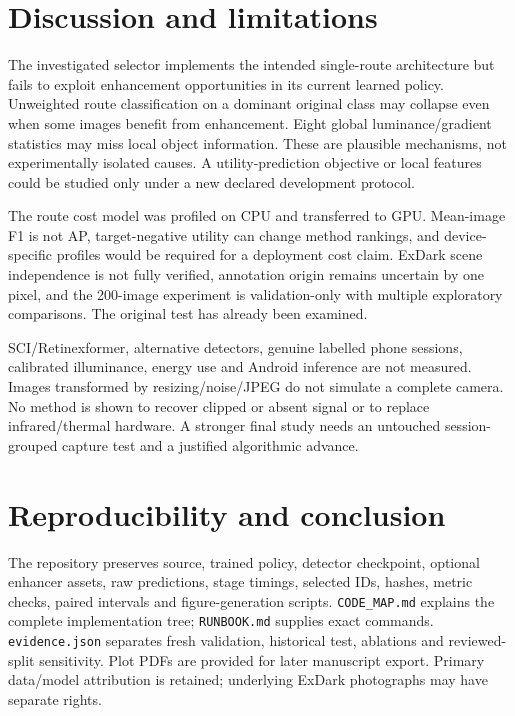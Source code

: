 \documentclass[11pt,a4paper]{article}
\begin{document}
\section{Discussion and limitations}

The investigated selector implements the intended single-route architecture but fails to exploit enhancement opportunities in its current learned policy. Unweighted route classification on a dominant original class may collapse even when some images benefit from enhancement. Eight global luminance/gradient statistics may miss local object information. These are plausible mechanisms, not experimentally isolated causes. A utility-prediction objective or local features could be studied only under a new declared development protocol.


The route cost model was profiled on CPU and transferred to GPU. Mean-image F1 is not AP, target-negative utility can change method rankings, and device-specific profiles would be required for a deployment cost claim. ExDark scene independence is not fully verified, annotation origin remains uncertain by one pixel, and the 200-image experiment is validation-only with multiple exploratory comparisons. The original test has already been examined.


SCI/Retinexformer, alternative detectors, genuine labelled phone sessions, calibrated illuminance, energy use and Android inference are not measured. Images transformed by resizing/noise/JPEG do not simulate a complete camera. No method is shown to recover clipped or absent signal or to replace infrared/thermal hardware. A stronger final study needs an untouched session-grouped capture test and a justified algorithmic advance.


\section{Reproducibility and conclusion}

The repository preserves source, trained policy, detector checkpoint, optional enhancer assets, raw predictions, stage timings, selected IDs, hashes, metric checks, paired intervals and figure-generation scripts. \texttt{CODE\_MAP.md} explains the complete implementation tree; \texttt{RUNBOOK.md} supplies exact commands. \texttt{evidence.json} separates fresh validation, historical test, ablations and reviewed-split sensitivity. Plot PDFs are provided for later manuscript export. Primary data/model attribution is retained; underlying ExDark photographs may have separate rights.
\end{document}
